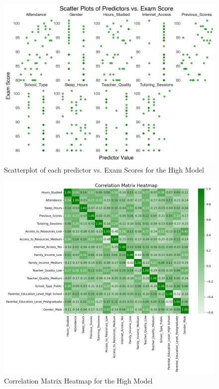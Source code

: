\documentclass[twocolumn]{article} %
\begin{document}
\begin{figure}[h]
  \centering
  \includegraphics[width=\columnwidth]{20-predictors-scatterplot.png}
  \caption{Scatterplot of each predictor vs. Exam Scores for the High Model}
  \label{20:predictors-scatterplot}
\end{figure}

\begin{figure}[h]
  \centering
  \includegraphics[width=\columnwidth]{21-corr-heatmap.png}
  \caption{Correlation Matrix Heatmap for the High Model}
  \label{21:corr-heatmap}
\end{figure}
\end{document}
